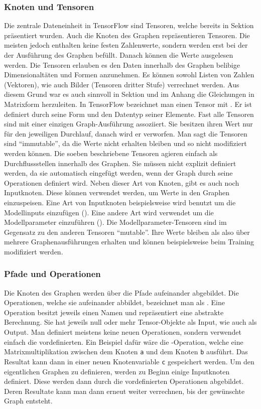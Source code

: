 \subsubsection{Knoten und Tensoren}
Die zentrale Dateneinheit in TensorFlow sind Tensoren, welche bereits in Sektion
 präsentiert wurden. Auch die Knoten des Graphen
repräsentieren Tensoren. Die meisten jedoch enthalten keine festen Zahlenwerte,
sondern werden erst bei der der Ausführung des Graphen befüllt. Danach können
die Werte ausgelesen werden. \para{} Die Tensoren erlauben es den Daten
innerhalb des Graphen belibige Dimensionaltäten und Formen anzunehmen. Es können
sowohl Listen von Zahlen (Vektoren), wie auch Bilder (Tensoren dritter Stufe)
verrechnet werden. Aus diesem Grund war es auch sinnvoll in Sektion
 und im Anhang  die Gleichungen in
Matrixform herzuleiten. \para{} In TensorFlow bezeichnet man einen Tensor mit
. Er ist definiert durch seine Form und den Datentyp seiner
Elemente. \para{} Fast alle Tensoren sind mit einer einzigen Graph-Ausführung
assoziiert. Sie besitzen ihren Wert nur für den jeweiligen Durchlauf, danach wird
er verworfen. Man sagt die Tensoren sind ``immutable'', da die Werte nicht
erhalten bleiben und so nicht modifiziert werden können. \para{} Die soeben
beschriebene Tensoren agieren einfach als Durchflussstellen innerhalb des
Graphen. Sie müssen nicht explizit definiert werden, da sie automatisch
eingefügt werden, wenn der Graph durch seine Operationen definiert wird. \para{}
Neben dieser Art von Knoten, gibt es auch noch Inputknoten. Diese können
verwendet werden, um Werte in den Graphen einzuspeisen. Eine Art von Inputknoten
beispielsweise wird benutzt um die Modellinputs einzufügen
(). Eine andere Art wird verwendet um die Modellparameter
einzuführen (). Die Modellparameter-Tensoren sind im Gegensatz
zu den anderen Tensoren ``mutable''. Ihre Werte bleiben als also über mehrere
Graphenausführungen erhalten und können beispielsweise beim Training modifiziert werden.

\subsubsection{Pfade und Operationen}
Die Knoten des Graphen werden über die Pfade aufeinander
abgebildet. Die Operationen, welche sie aufeinander abbildet, bezeichnet man
als . Eine Operation besitzt jeweils einen Namen und repräsentiert eine
abstrakte Berechnung. Sie hat jeweils null oder mehr Tensor-Objekte als
Input, wie auch als Output.
\para{}
Man definiert meistens keine neuen Operationen, sondern verwendet einfach die vordefinierten.
Ein Beispiel dafür wäre die -Operation, welche eine
Matrixmultiplikation zwischen dem Knoten \texttt{a} und dem Knoten \texttt{b}
ausführt. Das Resultat kann dann in einer neuen Knotenvariable
\texttt{c} gespeichert werden.
\para{}
Um den eigentlichen Graphen zu definieren, werden zu Beginn einige Inputknoten
definiert. Diese werden dann durch die vordefinierten Operationen abgebildet.
Deren Resultate kann man dann erneut weiter verrechnen, bis der gewünschte Graph entsteht.

